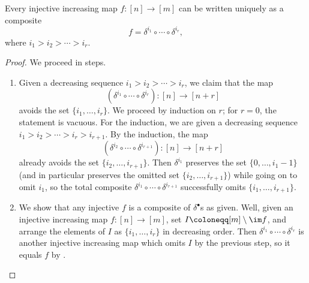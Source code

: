 \documentclass[../notes.tex]{subfiles}
\begin{document}
\begin{lemma} \label{lem:classify-embed}
	Every injective increasing map $f\colon[n]\to[m]$ can be written uniquely as a composite
	\[f=\delta^{i_1}\circ\cdots\circ\delta^{i_r},\]
	where $i_1>i_2>\cdots>i_r$.
\end{lemma}
\begin{proof}
	We proceed in steps.
	\begin{enumerate}
		

		\item Given a decreasing sequence $i_1> i_2>\cdots> i_r$, we claim that the map
		\[(\delta^{i_1}\circ\cdots\circ\delta^{i_r})\colon[n]\to[n+r]\]
		avoids the set $\{i_1,\ldots,i_r\}$. We proceed by induction on $r$; for $r=0$, the statement is vacuous. For the induction, we are given a decreasing sequence $i_1> i_2>\cdots> i_r> i_{r+1}$. By the induction, the map
		\[(\delta^{i_2}\circ\cdots\circ\delta^{i_{r+1}})\colon[n]\to[n+r]\]
		already avoids the set $\{i_2,\ldots,i_{r+1}\}$. Then $\delta^{i_1}$ preserves the set $\{0,\ldots,i_1-1\}$ (and in particular preserves the omitted set $\{i_2,\ldots,i_{r+1}\}$) while going on to omit $i_1$, so the total composite $\delta^{i_1}\circ\cdots\circ\delta^{i_{r+1}}$ successfully omits $\{i_1,\ldots,i_{r+1}\}$.

		\item We show that any injective $f$ is a composite of $\delta^\bullet$s as given. Well, given an injective increasing map $f\colon[n]\to[m]$, set $I\coloneqq[m]\setminus\im f$, and arrange the elements of $I$ as $\{i_1,\ldots,i_r\}$ in decreasing order. Then $\delta^{i_1}\circ\cdots\circ\delta^{i_r}$ is another injective increasing map which omits $I$ by the previous step, so it equals $f$ by .


\end{enumerate}
\end{proof}
\end{document}
